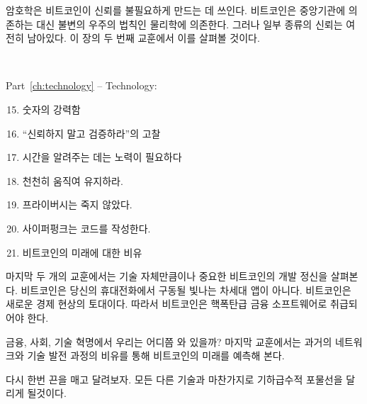 \begin{comment}
Cryptography is what Bitcoin uses to remove trust in authorities.
Instead of relying on centralized institutions, the system relies on the final
authority of our universe: physics. Some grains of trust still remain, however.
We will examine these grains in the second lesson of this chapter.
\end{comment}
암호학은 비트코인이 신뢰를 불필요하게 만드는 데 쓰인다.
비트코인은 중앙기관에 의존하는 대신 불변의 우주의 법칙인 물리학에 의존한다.
그러나 일부 종류의 신뢰는 여전히 남아있다.
이 장의 두 번째 교훈에서 이를 살펴볼 것이다.

~

\begin{samepage}
Part~\ref{ch:technology} -- Technology:

\begin{enumerate}
  \setcounter{enumi}{14}
  \item 숫자의 강력함
  \item \enquote{신뢰하지 말고 검증하라}의 고찰
  \item 시간을 알려주는 데는 노력이 필요하다
  \item 천천히 움직여 유지하라.
  \item 프라이버시는 죽지 않았다.
  \item 사이퍼펑크는 코드를 작성한다.
  \item 비트코인의 미래에 대한 비유
\end{enumerate}
\end{samepage}

\begin{comment}
The last couple of lessons explore the ethos of technological development in
Bitcoin, which is arguably as important as the technology itself. Bitcoin is not
the next shiny app on your phone. It is the foundation of a new economic
reality, which is why Bitcoin should be treated as nuclear-grade financial
software.
\end{comment}
마지막 두 개의 교훈에서는 기술 자체만큼이나 중요한 비트코인의 개발 정신을 살펴본다.
비트코인은 당신의 휴대전화에서 구동될 빛나는 차세대 앱이 아니다.
비트코인은 새로운 경제 현상의 토대이다. 
따라서 비트코인은 핵폭탄급 금융 소프트웨어로 취급되어야 한다.

\begin{comment}
Where are we in this financial, societal, and technological revolution? 

Networks and technologies of the past may serve as metaphors for Bitcoin's future, which
are explored in the last lesson of this chapter.
\end{comment}
금융, 사회, 기술 혁명에서 우리는 어디쯤 와 있을까?
마지막 교훈에서는 과거의 네트워크와 기술 발전 과정의 비유를 통해 비트코인의 미래를 예측해 본다.

\begin{comment}
Once more, strap in and enjoy the ride. Like all exponential technologies, we
are about to go parabolic.
\end{comment}
다시 한번 끈을 매고 달려보자. 모든 다른 기술과 마찬가지로 기하급수적 포물선을 달리게 될것이다.

